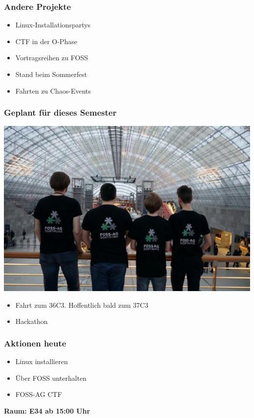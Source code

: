 \documentclass[12pt,utf8]{beamer}
\begin{document}
	\begin{frame}
		\frametitle{Andere Projekte}
		\begin{itemize}
			\item Linux-Installationspartys
			\vspace{0.5cm}
			\item CTF in der O-Phase
			\vspace{0.5cm}
			\item Vortragsreihen zu FOSS
			\vspace{0.5cm}
			\item Stand beim Sommerfest
			\vspace{0.5cm}
			\item Fahrten zu Chaos-Events
		\end{itemize}
	\end{frame}
	\begin{frame}
		\frametitle{Geplant für dieses Semester}

			
			\centering\includegraphics[width=0.9\linewidth]{resources/35C3.jpeg}
		\begin{itemize}
			\item Fahrt zum 36C3. Hoffentlich bald zum 37C3
			\item Hackathon
		\end{itemize}
	\end{frame}

	\begin{frame}
		\frametitle{Aktionen heute}
		\begin{itemize}
			\item Linux installieren
			\vspace{0.5cm}
			\item Über FOSS unterhalten
			\vspace{0.5cm}
			\item FOSS-AG CTF	
		\end{itemize}
	\vspace{0.5cm}
	\textbf{Raum: E34 ab 15:00 Uhr}
	\end{frame}
	
\end{document}
